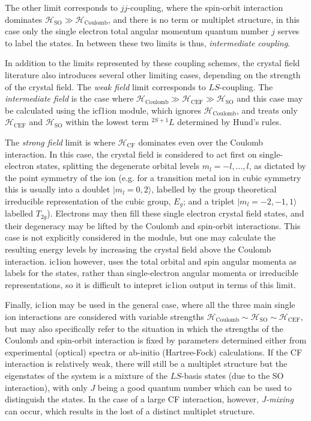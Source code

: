 The other limit corresponds to $jj$-coupling, where the spin-orbit interaction
dominates $\mathcal{H}_{\mathrm{SO}}\gg
\mathcal{H}_{\mathrm{Coulomb}}$, and there is no term or multiplet structure, 
in this case only the single electron total
angular momentum quantum number $j$ serves to label the states. 
In between these two limits is thus, \emph{intermediate coupling}. 

In addition to the limits represented by these coupling schemes, the crystal field literature
also introduces several other limiting cases, depending on the strength of the crystal
field. The \emph{weak field} limit corresponds to $LS$-coupling. The \emph{intermediate field} is
the case where $\mathcal{H}_{\mathrm{Coulomb}}\gg\mathcal{H}_{\mathrm{CEF}}\gg
\mathcal{H}_{\mathrm{SO}}$ and this case may be calculated using the {\prg icf1ion} module,
which ignores $\mathcal{H}_{\mathrm{Coulomb}}$, and treats only $\mathcal{H}_{\mathrm{CEF}}$ and
$\mathcal{H}_{\mathrm{SO}}$ within the lowest term $^{2S+1} L$ determined by Hund's rules.

The \emph{strong field} limit is where $\mathcal{H}_{\mathrm{CF}}$ dominates even over the Coulomb
interaction. In this case, the crystal field is considered to act first on single-electron states,
splitting the degenerate orbital levels $m_l=-l,...,l$, as dictated by the point symmetry of the
ion (e.g. for a transition metal ion in cubic symmetry this is usually into a doublet
$|m_l=0,2\rangle$, labelled by the group theoretical irreducible representation of the cubic group,
$E_g$; and a triplet $|m_l=-2,-1,1\rangle$ labelled $T_{2g}$). Electrons may then fill these single
electron crystal field states, and their degeneracy may be lifted by the Coulomb and spin-orbit
interactions. This case is not explicitly considered in the module, but one may calculate the
resulting energy levels by increasing the crystal field above the Coulomb interaction. {\prg
ic1ion} however, uses the total orbital and spin angular momenta as labels for the states, rather
than single-electron angular momenta or irreducible representations, so it is difficult to intepret
{\prg ic1ion} output in terms of this limit.

Finally, {\prg ic1ion} may be used in the general case, where all the three main
single ion interactions are considered with variable strengths
$\mathcal{H}_{\mathrm{Coulomb}}\sim
\mathcal{H}_{\mathrm{SO}}\sim
\mathcal{H}_{\mathrm{CEF}}$, but may also specifically refer to
the situation in which the strengths of the Coulomb and spin-orbit interaction is fixed by
parameters determined either from experimental (optical) spectra or ab-initio (Hartree-Fock)
calculations. If the CF interaction is relatively weak, there will still be a multiplet structure
but the eigenstates of the system is a mixture of the $LS$-basis states (due to the SO interaction),
with only $J$ being a good quantum number which can be used to distinguish the states. In the case
of a large CF interaction, however, \emph{J-mixing} can occur, which results in the lost of a
distinct multiplet structure.


